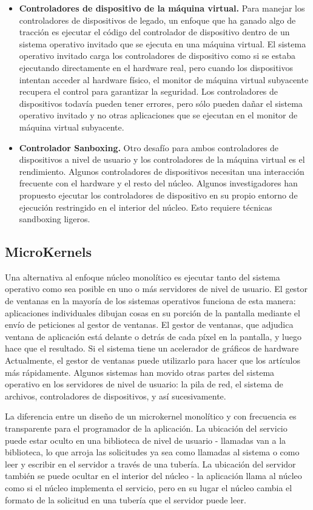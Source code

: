 \documentclass[10pt]{book}
\begin{document}
\begin{itemize}
\item \textbf{Controladores de dispositivo de la máquina virtual.} Para manejar los controladores de dispositivos de legado, un enfoque que ha ganado algo de tracción es ejecutar el código del controlador de dispositivo dentro de un sistema operativo invitado que se ejecuta en una máquina virtual. El sistema operativo invitado carga los controladores de dispositivo como si se estaba ejecutando directamente en el hardware real, pero cuando los dispositivos intentan acceder al hardware físico, el monitor de máquina virtual subyacente recupera el control para garantizar la seguridad. Los controladores de dispositivos todavía pueden tener errores, pero sólo pueden dañar el sistema operativo invitado y no otras aplicaciones que se ejecutan en el monitor de máquina virtual subyacente.

\item \textbf{Controlador Sanboxing.} Otro desafío para ambos controladores de dispositivos a nivel de usuario y los controladores de la máquina virtual es el rendimiento. Algunos controladores de dispositivos necesitan una interacción frecuente con el hardware y el resto del núcleo. Algunos investigadores han propuesto ejecutar los controladores de dispositivo en su propio entorno de ejecución restringido en el interior del núcleo. Esto requiere técnicas sandboxing ligeros.
\end{itemize}

\subsection{MicroKernels}
Una alternativa al enfoque núcleo monolítico es ejecutar tanto del sistema operativo como sea posible en uno o más servidores de nivel de usuario. El gestor de ventanas en la mayoría de los sistemas operativos funciona de esta manera: aplicaciones individuales dibujan cosas en su porción de la pantalla mediante el envío de peticiones al gestor de ventanas. El gestor de ventanas, que adjudica ventana de aplicación está delante o detrás de cada píxel en la pantalla, y luego hace que el resultado. Si el sistema tiene un acelerador de gráficos de hardware
Actualmente, el gestor de ventanas puede utilizarlo para hacer que los artículos más rápidamente. Algunos sistemas han movido otras partes del sistema operativo en los servidores de nivel de usuario: la pila de red, el sistema de archivos, controladores de dispositivos, y así sucesivamente.

La diferencia entre un diseño de un microkernel monolítico y con frecuencia es transparente para el programador de la aplicación. La ubicación del servicio puede estar oculto en una biblioteca de nivel de usuario - llamadas van a la biblioteca, lo que arroja las solicitudes ya sea como llamadas al sistema o como leer y escribir en el servidor a través de una tubería. La ubicación del servidor también se puede ocultar en el interior del núcleo - la aplicación llama al núcleo como si el núcleo implementa el servicio, pero en su lugar el núcleo cambia el formato de la solicitud en una tubería que el servidor puede leer.
\end{document}
